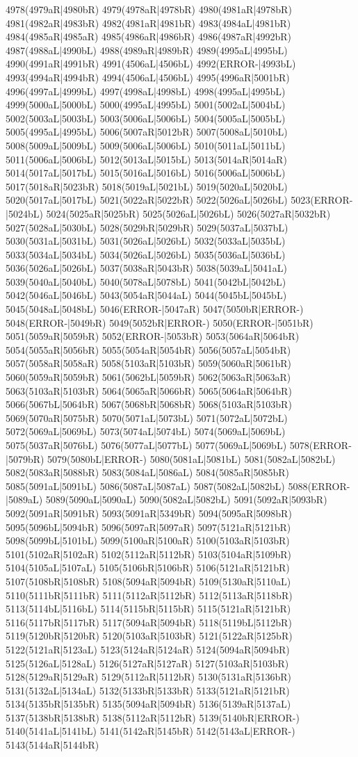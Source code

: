 4978(4979aR|4980bR) 4979(4978aR|4978bR) 4980(4981aR|4978bR) 4981(4982aR|4983bR) 4982(4981aR|4981bR) 4983(4984aL|4981bR) 4984(4985aR|4985aR) 4985(4986aR|4986bR) 4986(4987aR|4992bR) 4987(4988aL|4990bL) 4988(4989aR|4989bR) 4989(4995aL|4995bL) 4990(4991aR|4991bR) 4991(4506aL|4506bL) 4992(ERROR-|4993bL) 4993(4994aR|4994bR) 4994(4506aL|4506bL) 4995(4996aR|5001bR) 4996(4997aL|4999bL) 4997(4998aL|4998bL) 4998(4995aL|4995bL) 4999(5000aL|5000bL) 5000(4995aL|4995bL) 5001(5002aL|5004bL) 5002(5003aL|5003bL) 5003(5006aL|5006bL) 5004(5005aL|5005bL) 5005(4995aL|4995bL) 5006(5007aR|5012bR) 5007(5008aL|5010bL) 5008(5009aL|5009bL) 5009(5006aL|5006bL) 5010(5011aL|5011bL) 5011(5006aL|5006bL) 5012(5013aL|5015bL) 5013(5014aR|5014aR) 5014(5017aL|5017bL) 5015(5016aL|5016bL) 5016(5006aL|5006bL) 5017(5018aR|5023bR) 5018(5019aL|5021bL) 5019(5020aL|5020bL) 5020(5017aL|5017bL) 5021(5022aR|5022bR) 5022(5026aL|5026bL) 5023(ERROR-|5024bL) 5024(5025aR|5025bR) 5025(5026aL|5026bL) 5026(5027aR|5032bR) 5027(5028aL|5030bL) 5028(5029bR|5029bR) 5029(5037aL|5037bL) 5030(5031aL|5031bL) 5031(5026aL|5026bL) 5032(5033aL|5035bL) 5033(5034aL|5034bL) 5034(5026aL|5026bL) 5035(5036aL|5036bL) 5036(5026aL|5026bL) 5037(5038aR|5043bR) 5038(5039aL|5041aL) 5039(5040aL|5040bL) 5040(5078aL|5078bL) 5041(5042bL|5042bL) 5042(5046aL|5046bL) 5043(5054aR|5044aL) 5044(5045bL|5045bL) 5045(5048aL|5048bL) 5046(ERROR-|5047aR) 5047(5050bR|ERROR-) 5048(ERROR-|5049bR) 5049(5052bR|ERROR-) 5050(ERROR-|5051bR) 5051(5059aR|5059bR) 5052(ERROR-|5053bR) 5053(5064aR|5064bR) 5054(5055aR|5056bR) 5055(5054aR|5054bR) 5056(5057aL|5054bR) 5057(5058aR|5058aR) 5058(5103aR|5103bR) 5059(5060aR|5061bR) 5060(5059aR|5059bR) 5061(5062bL|5059bR) 5062(5063aR|5063aR) 5063(5103aR|5103bR) 5064(5065aR|5066bR) 5065(5064aR|5064bR) 5066(5067bL|5064bR) 5067(5068bR|5068bR) 5068(5103aR|5103bR) 5069(5070aR|5075bR) 5070(5071aL|5073bL) 5071(5072aL|5072bL) 5072(5069aL|5069bL) 5073(5074aL|5074bL) 5074(5069aL|5069bL) 5075(5037aR|5076bL) 5076(5077aL|5077bL) 5077(5069aL|5069bL) 5078(ERROR-|5079bR) 5079(5080bL|ERROR-) 5080(5081aL|5081bL) 5081(5082aL|5082bL) 5082(5083aR|5088bR) 5083(5084aL|5086aL) 5084(5085aR|5085bR) 5085(5091aL|5091bL) 5086(5087aL|5087aL) 5087(5082aL|5082bL) 5088(ERROR-|5089aL) 5089(5090aL|5090aL) 5090(5082aL|5082bL) 5091(5092aR|5093bR) 5092(5091aR|5091bR) 5093(5091aR|5349bR) 5094(5095aR|5098bR) 5095(5096bL|5094bR) 5096(5097aR|5097aR) 5097(5121aR|5121bR) 5098(5099bL|5101bL) 5099(5100aR|5100aR) 5100(5103aR|5103bR) 5101(5102aR|5102aR) 5102(5112aR|5112bR) 5103(5104aR|5109bR) 5104(5105aL|5107aL) 5105(5106bR|5106bR) 5106(5121aR|5121bR) 5107(5108bR|5108bR) 5108(5094aR|5094bR) 5109(5130aR|5110aL) 5110(5111bR|5111bR) 5111(5112aR|5112bR) 5112(5113aR|5118bR) 5113(5114bL|5116bL) 5114(5115bR|5115bR) 5115(5121aR|5121bR) 5116(5117bR|5117bR) 5117(5094aR|5094bR) 5118(5119bL|5112bR) 5119(5120bR|5120bR) 5120(5103aR|5103bR) 5121(5122aR|5125bR) 5122(5121aR|5123aL) 5123(5124aR|5124aR) 5124(5094aR|5094bR) 5125(5126aL|5128aL) 5126(5127aR|5127aR) 5127(5103aR|5103bR) 5128(5129aR|5129aR) 5129(5112aR|5112bR) 5130(5131aR|5136bR) 5131(5132aL|5134aL) 5132(5133bR|5133bR) 5133(5121aR|5121bR) 5134(5135bR|5135bR) 5135(5094aR|5094bR) 5136(5139aR|5137aL) 5137(5138bR|5138bR) 5138(5112aR|5112bR) 5139(5140bR|ERROR-) 5140(5141aL|5141bL) 5141(5142aR|5145bR) 5142(5143aL|ERROR-) 5143(5144aR|5144bR) 